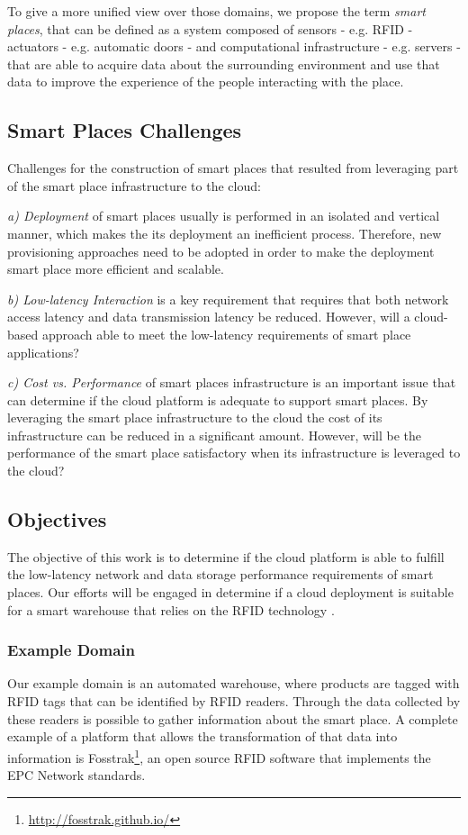 To give a more unified view over those domains, we propose the term \textit{smart places},
that can be defined as a system composed of sensors - e.g. RFID - actuators - e.g. automatic
doors - and computational infrastructure - e.g. servers - that are able to acquire data about the
surrounding environment and use that data to improve the experience of the people interacting with
the place.

\subsection{Smart Places Challenges}
\label{sub:challenges}
Challenges \cite{caceres2012ubicomp} for the construction of smart places that resulted from leveraging
part of the smart place infrastructure to the cloud:

\textit{a) Deployment} of smart places usually is performed in an isolated and vertical manner, which
makes the its deployment an inefficient process. Therefore, new provisioning approaches need to be
adopted in order to make the deployment smart place more efficient and scalable.

\textit{b) Low-latency Interaction} is a key requirement that requires that both network access
latency and data transmission latency be reduced. However, will a cloud-based
approach able to meet the low-latency requirements of smart place applications?

\textit{c) Cost vs. Performance} of smart places infrastructure is an important issue
that can determine if the cloud platform is adequate to support smart places. By
leveraging the smart place infrastructure to the cloud the cost of its infrastructure
can be reduced in a significant amount. However, will be the performance of the
smart place satisfactory when its infrastructure is leveraged to the cloud?

\subsection{Objectives}
\label{sub:objectives}
The objective of this work is to determine if the cloud platform is able to fulfill the low-latency network
and data storage performance requirements of smart places. Our efforts will be engaged in
determine if a cloud deployment is suitable for a smart warehouse that relies on
the RFID technology \cite{want2006introduction}.

\subsubsection{Example Domain}
\label{subs:domain}
Our example domain is an automated warehouse, where products are tagged with \gls{RFID} tags that
can be identified by \gls{RFID} readers. Through the data collected by these readers is possible to
gather information about the smart place. A complete example of a platform that allows the transformation
of that data into information is Fosstrak\footnote{\url{http://fosstrak.github.io/}}, an open
source \gls{RFID} software that implements the \gls{EPC} Network standards.

